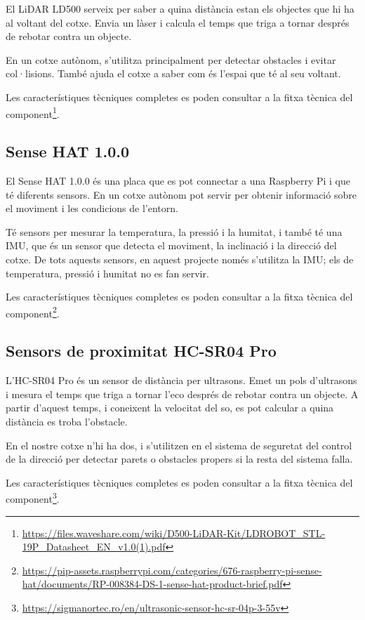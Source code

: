 \documentclass[11pt,a4paper]{article}
\begin{document}
El LiDAR LD500 serveix per saber a quina distància estan els objectes que hi ha al voltant del cotxe. Envia un làser i calcula el temps que triga a tornar després de rebotar contra un objecte.

En un cotxe autònom, s’utilitza principalment per detectar obstacles i evitar col·lisions. També ajuda el cotxe a saber com és l’espai que té al seu voltant.

Les característiques tècniques completes es poden consultar a la fitxa tècnica del component\footnote{\url{https://files.waveshare.com/wiki/D500-LiDAR-Kit/LDROBOT_STL-19P_Datasheet_EN_v1.0(1).pdf}}.

\subsection{Sense HAT 1.0.0}

El Sense HAT 1.0.0 és una placa que es pot connectar a una Raspberry Pi i que té diferents sensors. En un cotxe autònom pot servir per obtenir informació sobre el moviment i les condicions de l’entorn.

Té sensors per mesurar la temperatura, la pressió i la humitat, i també té una IMU, que és un sensor que detecta el moviment, la inclinació i la direcció del cotxe. De tots aquests sensors, en aquest projecte només s’utilitza la IMU; els de temperatura, pressió i humitat no es fan servir.

Les característiques tècniques completes es poden consultar a la fitxa tècnica del component\footnote{\url{https://pip-assets.raspberrypi.com/categories/676-raspberry-pi-sense-hat/documents/RP-008384-DS-1-sense-hat-product-brief.pdf}}.

\subsection{Sensors de proximitat HC-SR04 Pro}

L’HC-SR04 Pro és un sensor de distància per ultrasons. Emet un pols d’ultrasons i mesura el temps que triga a tornar l’eco després de rebotar contra un objecte. A partir d’aquest temps, i coneixent la velocitat del so, es pot calcular a quina distància es troba l’obstacle.

En el nostre cotxe n’hi ha dos, i s’utilitzen en el sistema de seguretat del control de la direcció per detectar parets o obstacles propers si la resta del sistema falla.

Les característiques tècniques completes es poden consultar a la fitxa tècnica del component\footnote{\url{https://sigmanortec.ro/en/ultrasonic-sensor-hc-sr-04p-3-55v}}.
\end{document}
